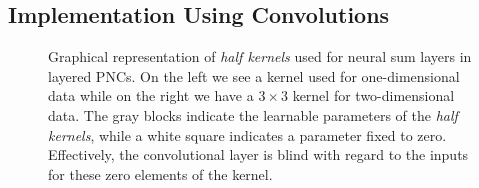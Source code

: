 \documentclass[letterpaper]{article} %
\begin{document}
\subsection{Implementation Using Convolutions}


\begin{figure}[t]
    \begin{minipage}[c]{0.49\columnwidth}
        \centering

    \end{minipage}
    \begin{minipage}[c]{0.49\columnwidth}
        \centering

    \end{minipage}



    \caption{Graphical representation of \textit{half kernels} used for neural sum layers in layered PNCs. On the left we see a kernel used for one-dimensional data while on the right we have a $3\times3$ kernel for two-dimensional data. The gray blocks indicate the learnable parameters of the \textit{half kernels}, while a white square indicates a parameter fixed to zero. Effectively, the convolutional layer is blind with regard to the inputs for these zero elements of the kernel.}
    \label{fig:kernel}

\end{figure}
\end{document}
